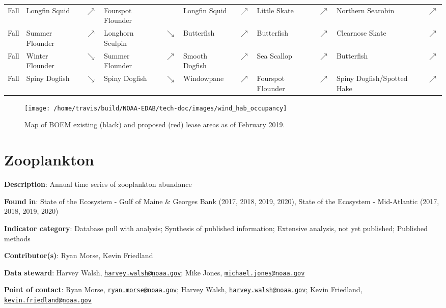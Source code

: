 \documentclass[
]{book}
\begin{document}
\begin{table}[!h]
{\begin{tabular}[t]{lllllllllll}
Fall & Longfin Squid & $\nearrow$ & Fourspot Flounder &  & Longfin Squid & $\nearrow$ & Little Skate & $\nearrow$ & Northern Searobin & $\nearrow$\\
Fall & Summer Flounder & $\nearrow$ & Longhorn Sculpin & $\searrow$ & Butterfish & $\nearrow$ & Butterfish & $\nearrow$ & Clearnose Skate & $\nearrow$\\
Fall & Winter Flounder & $\searrow$ & Summer Flounder & $\nearrow$ & Smooth Dogfish & $\nearrow$ & Sea Scallop & $\nearrow$ & Butterfish & $\nearrow$\\
Fall & Spiny Dogfish & $\searrow$ & Spiny Dogfish & $\searrow$ & Windowpane & $\nearrow$ & Fourspot Flounder & $\nearrow$ & Spiny Dogfish/Spotted Hake & $\nearrow$\\
\bottomrule
\end{tabular}}
\end{table}

\begin{figure}
\texttt{[image: /home/travis/build/NOAA-EDAB/tech-doc/images/wind\_hab\_occupancy]} \caption{Map of BOEM existing (black) and proposed (red) lease areas as of February 2019.}\label{fig:wind-map}
\end{figure}

\hypertarget{zooabund}{%
\chapter{Zooplankton}\label{zooabund}}

\textbf{Description}: Annual time series of zooplankton abundance

\textbf{Found in}: State of the Ecosystem - Gulf of Maine \& Georges Bank (2017, 2018, 2019, 2020), State of the Ecosystem - Mid-Atlantic (2017, 2018, 2019, 2020)

\textbf{Indicator category}: Database pull with analysis; Synthesis of published information; Extensive analysis, not yet published; Published methods

\textbf{Contributor(s)}: Ryan Morse, Kevin Friedland

\textbf{Data steward}: Harvey Walsh, \href{mailto:harvey.walsh@noaa.gov}{\nolinkurl{harvey.walsh@noaa.gov}}; Mike Jones, \href{mailto:michael.jones@noaa.gov}{\nolinkurl{michael.jones@noaa.gov}}

\textbf{Point of contact}: Ryan Morse, \href{mailto:ryan.morse@noaa.gov}{\nolinkurl{ryan.morse@noaa.gov}}; Harvey Walsh, \href{mailto:harvey.walsh@noaa.gov}{\nolinkurl{harvey.walsh@noaa.gov}}; Kevin Friedland, \href{mailto:kevin.friedland@noaa.gov}{\nolinkurl{kevin.friedland@noaa.gov}}
\end{document}
